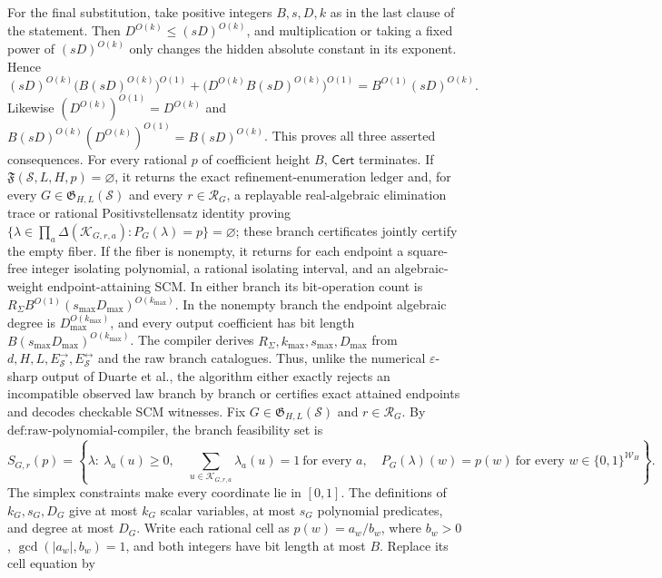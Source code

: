 For the final substitution, take positive integers \(B,s,D,k\) as in the last clause of the statement.  Then \(D^{O(k)}\le(sD)^{O(k)}\), and multiplication or taking a fixed power of \((sD)^{O(k)}\) only changes the hidden absolute constant in its exponent.  Hence
\[
(sD)^{O(k)}\bigl(B(sD)^{O(k)}\bigr)^{O(1)}
+\bigl(D^{O(k)}B(sD)^{O(k)}\bigr)^{O(1)}
=B^{O(1)}(sD)^{O(k)}.
\]
Likewise \((D^{O(k)})^{O(1)}=D^{O(k)}\) and \(B(sD)^{O(k)}(D^{O(k)})^{O(1)}=B(sD)^{O(k)}\).  This proves all three asserted consequences.
For every rational \(p\) of coefficient height \(B\), \(\mathsf{Cert}\) terminates. If \(\mathfrak F(\mathcal S,L,H,p)=\varnothing\), it returns the exact refinement-enumeration ledger and, for every \(G\in\mathfrak G_{H,L}(\mathcal S)\) and every \(r\in\mathcal R_G\), a replayable real-algebraic elimination trace or rational Positivstellensatz identity proving \(\{\lambda\in\prod_a\Delta(\mathcal K_{G,r,a}):P_G(\lambda)=p\}=\varnothing\); these branch certificates jointly certify the empty fiber. If the fiber is nonempty, it returns for each endpoint a square-free integer isolating polynomial, a rational isolating interval, and an algebraic-weight endpoint-attaining SCM. In either branch its bit-operation count is \(R_{\Sigma}B^{O(1)}(s_{\max}D_{\max})^{O(k_{\max})}\). In the nonempty branch the endpoint algebraic degree is \(D_{\max}^{O(k_{\max})}\), and every output coefficient has bit length \(B(s_{\max}D_{\max})^{O(k_{\max})}\). The compiler derives \(R_{\Sigma},k_{\max},s_{\max},D_{\max}\) from \(d,H,L,E_{\mathcal S}^{\to},E_{\mathcal S}^{\leftrightarrow}\) and the raw branch catalogues. Thus, unlike the numerical \(\varepsilon\)-sharp output of Duarte et al., the algorithm either exactly rejects an incompatible observed law branch by branch or certifies exact attained endpoints and decodes checkable SCM witnesses.
Fix \(G\in\mathfrak G_{H,L}(\mathcal S)\) and \(r\in\mathcal R_G\).  By \(\text{def:raw-polynomial-compiler}\), the branch feasibility set is
\[
S_{G,r}(p)=\left\{\lambda:\
\lambda_a(u)\ge0,\quad
\sum_{u\in\mathcal K_{G,r,a}}\lambda_a(u)=1\ \text{for every }a,\quad
P_G(\lambda)(w)=p(w)\ \text{for every }w\in\{0,1\}^{\mathcal W_H}
\right\}.
\tag{20}
\]
The simplex constraints make every coordinate lie in \([0,1]\).  The definitions of \(k_G,s_G,D_G\) give at most \(k_G\) scalar variables, at most \(s_G\) polynomial predicates, and degree at most \(D_G\).  Write each rational cell as \(p(w)=a_w/b_w\), where \(b_w>0\), \(\gcd(|a_w|,b_w)=1\), and both integers have bit length at most \(B\).  Replace its cell equation by
